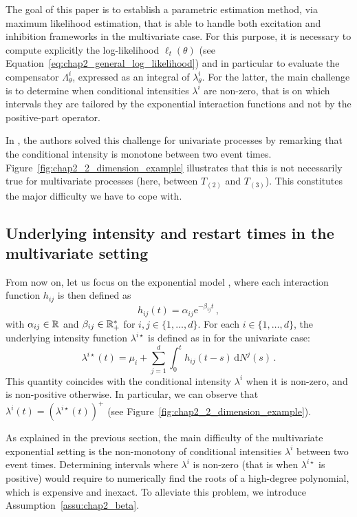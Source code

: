     The goal of this paper is to establish a parametric estimation method, via maximum likelihood estimation, that is able to handle both excitation and inhibition frameworks in the multivariate case.
    For this purpose, it is necessary to compute explicitly the log-likelihood \(\ell_t(\theta)\) (see Equation~\eqref{eq:chap2_general_log_likelihood}) and in particular to evaluate the compensator \(\Lambda_\theta^i\), expressed as an integral of \(\lambda_\theta^i\).
    For the latter, the main challenge is to determine when conditional intensities \(\lambda^i\) are non-zero, that is on which intervals they are tailored by the exponential interaction functions and not by the positive-part operator.

    In \textcite{bonnet2021}, the authors solved this challenge for univariate processes by remarking that the conditional intensity is monotone between two event times.
    Figure~\ref{fig:chap2_2_dimension_example} illustrates that this is not necessarily true for multivariate processes (here, between \(T_{(2)}\) and \(T_{(3)}\)).
    This constitutes the major difficulty we have to cope with.

  \subsection{Underlying intensity and restart times in the multivariate setting}

    From now on, let us focus on the exponential model \parencite{Hawkes1971}, where each interaction function $h_{ij}$ is then defined as
    \[h_{ij}(t) = \alpha_{ij}\mathrm{e}^{-\beta_{ij}t}\,,\]
    with $\alpha_{ij}\in{\mathbb R}$ and $\beta_{ij}\in{\mathbb R}_+^*$ for $i,j\in \{1,\ldots, d\}$.
    For each $i\in\{1,\ldots, d\}$, the underlying intensity function $\lambda^{i\star}$ is defined as in \textcite{bonnet2021} for the univariate case:
    \[\lambda^{i\star}(t) = \mu_i + \sum_{j=1}^{d}{\int_{0}^{t}{h_{ij}(t-s)\,\mathrm{d}N^j(s)}}\,.\]
    This quantity coincides with the conditional intensity \(\lambda^i\) when it is non-zero, and is non-positive otherwise.
    In particular, we can observe that \(\lambda^i (t) = \left( \lambda^{i\star}(t) \right)^+\) (see Figure~\ref{fig:chap2_2_dimension_example}).

    As explained in the previous section, the main difficulty of the multivariate exponential setting is the non-monotony of conditional intensities \(\lambda^i\) between two event times.
    Determining intervals where \(\lambda^i\) is non-zero (that is when \(\lambda^{i\star}\) is positive) would require to numerically find the roots of a high-degree polynomial, which is expensive and inexact.
    To alleviate this problem, we introduce Assumption~\ref{assu:chap2_beta}.

